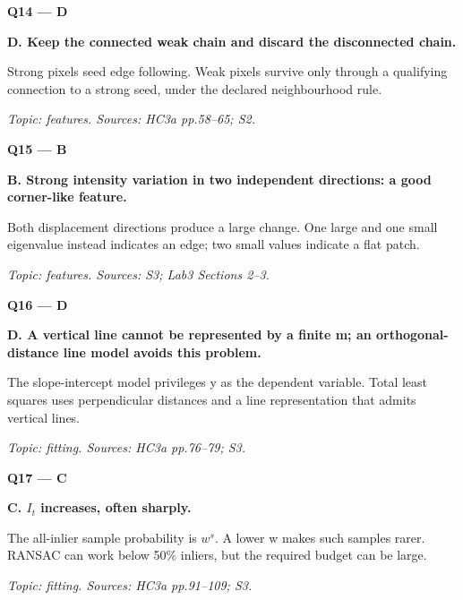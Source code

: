 \documentclass[11pt,a4paper]{article}
\begin{document}
\par\vspace{12pt}
\begin{minipage}{\linewidth}
\textbf{Q14 — D}\par\smallskip
\textbf{D. Keep the connected weak chain and discard the disconnected chain.}\par
Strong pixels seed edge following. Weak pixels survive only through a qualifying connection to a strong seed,\allowbreak{} under the declared neighbourhood rule.\par
{\small\itshape Topic: features. Sources: HC3a pp.58–65; S2.}

\end{minipage}
\par\vspace{12pt}
\begin{minipage}{\linewidth}
\textbf{Q15 — B}\par\smallskip
\textbf{B. Strong intensity variation in two independent directions: a good corner-like feature.}\par
Both displacement directions produce a large change. One large and one small eigenvalue instead indicates an edge; two small values indicate a flat patch.\par
{\small\itshape Topic: features. Sources: S3; Lab3 Sections 2–3.}

\end{minipage}
\par\vspace{12pt}
\begin{minipage}{\linewidth}
\textbf{Q16 — D}\par\smallskip
\textbf{D. A vertical line cannot be represented by a finite m; an orthogonal-distance line model avoids this problem.}\par
The slope-intercept model privileges y as the dependent variable. Total least squares uses perpendicular distances and a line representation that admits vertical lines.\par
{\small\itshape Topic: fitting. Sources: HC3a pp.76–79; S3.}

\end{minipage}
\par\vspace{12pt}
\begin{minipage}{\linewidth}
\textbf{Q17 — C}\par\smallskip
\textbf{C. \(I_t\) increases,\allowbreak{} often sharply.}\par
The all-inlier sample probability is \(w^s\). A lower w makes such samples rarer. RANSAC can work below 50\% inliers,\allowbreak{} but the required budget can be large.\par
{\small\itshape Topic: fitting. Sources: HC3a pp.91–109; S3.}

\end{minipage}
\end{document}
